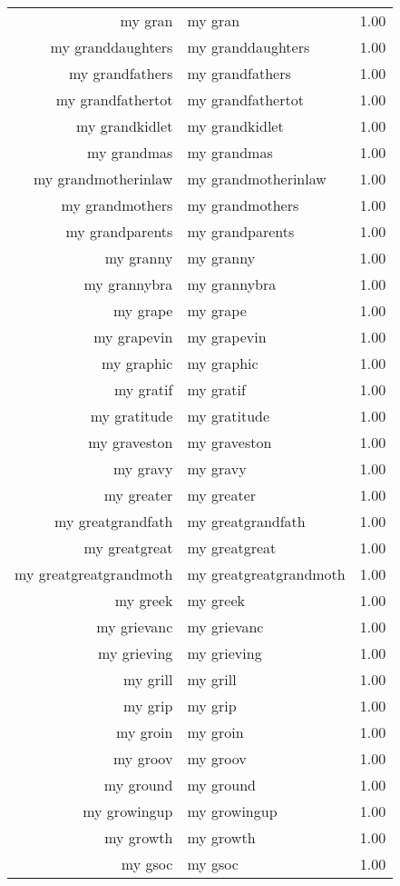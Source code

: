 \begin{table}[ht]
\begin{tabular}{rlr}
  my gran & my gran & 1.00 \\ 
  my granddaughters & my granddaughters & 1.00 \\ 
  my grandfathers & my grandfathers & 1.00 \\ 
  my grandfathertot & my grandfathertot & 1.00 \\ 
  my grandkidlet & my grandkidlet & 1.00 \\ 
  my grandmas & my grandmas & 1.00 \\ 
  my grandmotherinlaw & my grandmotherinlaw & 1.00 \\ 
  my grandmothers & my grandmothers & 1.00 \\ 
  my grandparents & my grandparents & 1.00 \\ 
  my granny & my granny & 1.00 \\ 
  my grannybra & my grannybra & 1.00 \\ 
  my grape & my grape & 1.00 \\ 
  my grapevin & my grapevin & 1.00 \\ 
  my graphic & my graphic & 1.00 \\ 
  my gratif & my gratif & 1.00 \\ 
  my gratitude & my gratitude & 1.00 \\ 
  my graveston & my graveston & 1.00 \\ 
  my gravy & my gravy & 1.00 \\ 
  my greater & my greater & 1.00 \\ 
  my greatgrandfath & my greatgrandfath & 1.00 \\ 
  my greatgreat & my greatgreat & 1.00 \\ 
  my greatgreatgrandmoth & my greatgreatgrandmoth & 1.00 \\ 
  my greek & my greek & 1.00 \\ 
  my grievanc & my grievanc & 1.00 \\ 
  my grieving & my grieving & 1.00 \\ 
  my grill & my grill & 1.00 \\ 
  my grip & my grip & 1.00 \\ 
  my groin & my groin & 1.00 \\ 
  my groov & my groov & 1.00 \\ 
  my ground & my ground & 1.00 \\ 
  my growingup & my growingup & 1.00 \\ 
  my growth & my growth & 1.00 \\ 
  my gsoc & my gsoc & 1.00 \\ 

\end{tabular}
\end{table}
